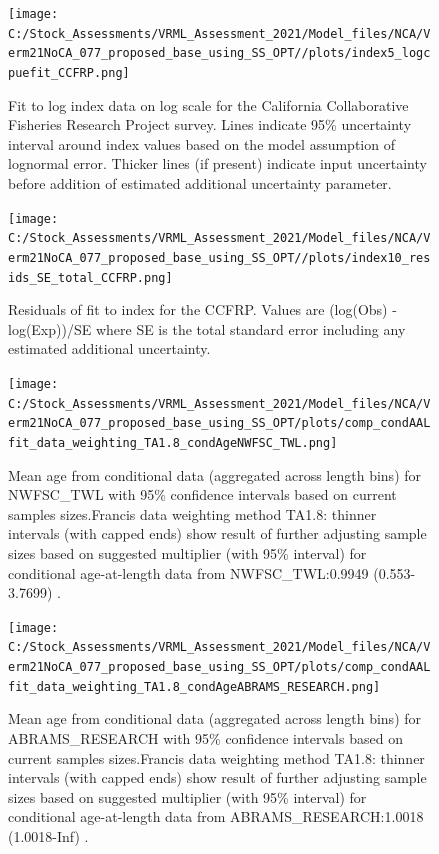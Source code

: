 \documentclass[
  english,
  a4paper,
]{article}
\begin{document}
\begin{figure}
\centering
\texttt{[image: C:/Stock\_Assessments/VRML\_Assessment\_2021/Model\_files/NCA/Verm21NoCA\_077\_proposed\_base\_using\_SS\_OPT//plots/index5\_logcpuefit\_CCFRP.png]}
\caption{Fit to log index data on log scale for the California Collaborative Fisheries Research Project survey. Lines indicate 95\% uncertainty interval around index values based on the model assumption of lognormal error. Thicker lines (if present) indicate input uncertainty before addition of estimated additional uncertainty parameter.\label{fig:log-cpue-CCFRP}}
\end{figure}

\begin{figure}
\centering
\texttt{[image: C:/Stock\_Assessments/VRML\_Assessment\_2021/Model\_files/NCA/Verm21NoCA\_077\_proposed\_base\_using\_SS\_OPT//plots/index10\_resids\_SE\_total\_CCFRP.png]}
\caption{Residuals of fit to index for the CCFRP. Values are (log(Obs) - log(Exp))/SE where SE is the total standard error including any estimated additional uncertainty.\label{fig:cpue-resid-CCFRP}}
\end{figure}

\begin{figure}
\centering
\texttt{[image: C:/Stock\_Assessments/VRML\_Assessment\_2021/Model\_files/NCA/Verm21NoCA\_077\_proposed\_base\_using\_SS\_OPT/plots/comp\_condAALfit\_data\_weighting\_TA1.8\_condAgeNWFSC\_TWL.png]}
\caption{Mean age from conditional data (aggregated across length bins) for NWFSC\_TWL with 95\% confidence intervals based on current samples sizes.Francis data weighting method TA1.8: thinner intervals (with capped ends) show result of further adjusting sample sizes based on suggested multiplier (with 95\% interval) for conditional age-at-length data from NWFSC\_TWL:0.9949 (0.553-3.7699) .\label{fig:comp_condAALfit_data_weighting_TA1.8_condAgeNWFSC_TWL}}
\end{figure}

\begin{figure}
\centering
\texttt{[image: C:/Stock\_Assessments/VRML\_Assessment\_2021/Model\_files/NCA/Verm21NoCA\_077\_proposed\_base\_using\_SS\_OPT/plots/comp\_condAALfit\_data\_weighting\_TA1.8\_condAgeABRAMS\_RESEARCH.png]}
\caption{Mean age from conditional data (aggregated across length bins) for ABRAMS\_RESEARCH with 95\% confidence intervals based on current samples sizes.Francis data weighting method TA1.8: thinner intervals (with capped ends) show result of further adjusting sample sizes based on suggested multiplier (with 95\% interval) for conditional age-at-length data from ABRAMS\_RESEARCH:1.0018 (1.0018-Inf) .\label{fig:comp_condAALfit_data_weighting_TA1.8_condAgeABRAMS_RESEARCH}}
\end{figure}
\end{document}
